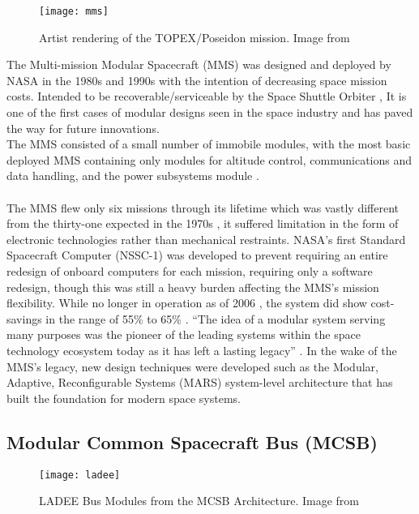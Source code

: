 \begin{wrapfigure}{r}{0.45\textwidth}
	\centering
	\vspace{-\baselineskip}
	
	\texttt{[image: mms]}
	\caption{Artist rendering of the TOPEX/Poseidon mission. Image from \cite{poseidonFacts}}
	\label{MMS}
\end{wrapfigure}
 The Multi-mission Modular Spacecraft (MMS) was designed and deployed by NASA in the 1980s and 1990s \cite{Esper2005ModularAR}  with the intention of decreasing space mission costs. Intended to be recoverable/serviceable by the Space Shuttle Orbiter \cite{NasaMMS},  It is one of the first cases of modular designs seen in the space industry and has paved the way for future innovations.
 \\
 The MMS consisted of a small number of immobile modules, with the most basic deployed MMS containing only modules for altitude control, communications and data handling, and the power subsystems module \cite{Esper2005ModularAR}. 
 \\\\
 \newpage
 The MMS flew only six missions through its lifetime which was vastly different from the thirty-one expected in the 1970s \cite{Esper2005ModularAR},  it suffered limitation in the form of electronic technologies rather than mechanical restraints. NASA’s first Standard Spacecraft Computer (NSSC-1) \cite{10.1145/358234.358252}  was developed to prevent requiring an entire redesign of onboard computers for each mission, requiring only a software redesign, though this was still a heavy burden affecting the MMS’s mission flexibility. While no longer in operation as of 2006 \cite{hupp2006nasa}, the system did show cost-savings in the range of 55\% to 65\% \cite{Esper2005ModularAR}. 
 “The idea of a modular system serving many purposes was the pioneer of the leading systems within the space technology ecosystem today as it has left a lasting legacy” \cite{Esper2005ModularAR}.  In the wake of the MMS’s legacy, new design techniques were developed such as the Modular, Adaptive, Reconfigurable Systems (MARS) system-level architecture \cite{Esper2005ModularAR} that has built the foundation for modern space systems.
 
\subsection{Modular Common Spacecraft Bus (MCSB)}
\begin{wrapfigure}{r}{0.4\textwidth}
	\centering
	\vspace{-\baselineskip}
	
	\texttt{[image: ladee]}
	\caption{LADEE Bus Modules from the MCSB Architecture. Image from \cite{5446989}}
	\label{LADEE}
\end{wrapfigure}

